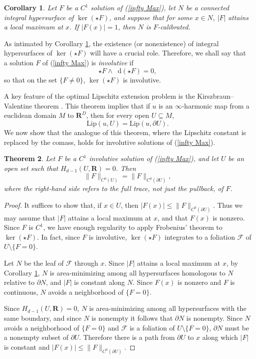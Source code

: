\documentclass[reqno,11pt]{amsart}
\newcommand{\RR}{\mathbf{R}}
\newcommand*\dif{\mathop{}\!\mathrm{d}}
\newcommand{\Lip}{\mathrm{Lip}}
\newcommand{\dfn}[1]{\emph{#1}\index{#1}}
\newtheorem{theorem}{Theorem}[section]
\newtheorem{corollary}[theorem]{Corollary}
\theoremstyle{definition}
\numberwithin{equation}{section}
\begin{document}
\begin{corollary}\label{infty Max calibrates}
Let $F$ be a $C^1$ solution of (\ref{infty Max}), let $N$ be a connected integral hypersurface of $\ker(\star F)$, and suppose that for some $x \in N$, $|F|$ attains a local maximum at $x$.
If $|F(x)| = 1$, then $N$ is $F$-calibrated.
\end{corollary}

As intimated by Corollary \ref{infty Max calibrates}, the existence (or nonexistence) of integral hypersurfaces of $\ker(\star F)$ will have a crucial role.
Therefore, we shall say that a solution $F$ of (\ref{infty Max}) is \dfn{involutive} if 
$$\star F \wedge \dif(\star F) = 0,$$
so that on the set $\{F \neq 0\}$, $\ker(\star F)$ is involutive.

A key feature of the optimal Lipschitz extension problem is the Kirszbraun--Valentine theorem \cite{Lang1997}.
This theorem implies that if $u$ is an $\infty$-harmonic map from a euclidean domain $M$ to $\RR^D$, then for every open $U \subseteq M$,
$$\Lip(u, U) = \Lip(u, \partial U).$$
We now show that the analogue of this theorem, where the Lipschitz constant is replaced by the comass, holds for involutive solutions of (\ref{infty Max}).

\begin{theorem}\label{ABC inequality}
Let $F$ be a $C^1$ involutive solution of (\ref{infty Max}), and let $U$ be an open set such that $H_{d - 1}(U, \RR) = 0$.
Then 
$$\|F\|_{C^0(U)} = \|F\|_{C^0(\partial U)},$$
where the right-hand side refers to the full trace, not just the pullback, of $F$.
\end{theorem}
\begin{proof}
It suffices to show that, if $x \in U$, then $|F(x)| \leq \|F\|_{C^0(\partial U)}$.
Thus we may assume that $|F|$ attains a local maximum at $x$, and that $F(x)$ is nonzero.
Since $F$ is $C^1$, we have enough regularity to apply Frobenius' theorem to $\ker(\star F)$.
In fact, since $F$ is involutive, $\ker(\star F)$ integrates to a foliation $\mathscr F$ of $U \setminus \{F = 0\}$.

Let $N$ be the leaf of $\mathscr F$ through $x$.
Since $|F|$ attains a local maximum at $x$, by Corollary \ref{infty Max calibrates}, $N$ is area-minimizing among all hypersurfaces homologous to $N$ relative to $\partial N$, and $|F|$ is constant along $N$.
Since $F(x)$ is nonzero and $F$ is continuous, $N$ avoids a neighborhood of $\{F = 0\}$.

Since $H_{d - 1}(U, \RR) = 0$, $N$ is area-minimizing among all hypersurfaces with the same boundary, and since $N$ is nonempty it follows that $\partial N$ is nonempty.
Since $N$ avoids a neighborhood of $\{F = 0\}$ and $\mathscr F$ is a foliation of $U \setminus \{F = 0\}$, $\partial N$ must be a nonempty subset of $\partial U$.
Therefore there is a path from $\partial U$ to $x$ along which $|F|$ is constant and $|F(x)| \leq \|F\|_{C^0(\partial U)}$.
\end{proof}
\end{document}
